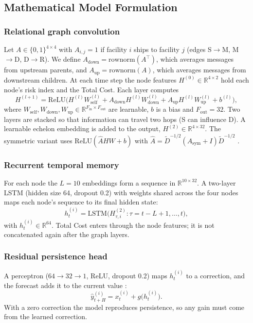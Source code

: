 \documentclass[conference]{IEEEtran}
\newcommand{\ReLU}{\mathrm{ReLU}}
\begin{document}
\subsection{Mathematical Model Formulation}\label{sec:math}
\subsubsection{Relational graph convolution}
Let $A\in\{0,1\}^{4\times4}$ with $A_{i,j}=1$ if facility $i$ ships to facility $j$ (edges S$\to$M, M$\to$D, D$\to$R). We define $A_{\mathrm{down}}=\mathrm{rownorm}(A^{\top})$, which averages messages from upstream parents, and $A_{\mathrm{up}}=\mathrm{rownorm}(A)$, which averages messages from downstream children. At each time step the node features $H^{(0)}\in\mathbb{R}^{4\times2}$ hold each node's risk index and the Total Cost. Each layer computes
\begin{equation}
H^{(l+1)}=\ReLU\!\big(H^{(l)}W^{(l)}_{\mathrm{self}}+A_{\mathrm{down}}H^{(l)}W^{(l)}_{\mathrm{down}}+A_{\mathrm{up}}H^{(l)}W^{(l)}_{\mathrm{up}}+b^{(l)}\big),
\end{equation}
where $W_{\mathrm{self}},W_{\mathrm{down}},W_{\mathrm{up}}\in\mathbb{R}^{F_{\mathrm{in}}\times F_{\mathrm{out}}}$ are learnable, $b$ is a bias and $F_{\mathrm{out}}=32$. Two layers are stacked so that information can travel two hops (S can influence D). A learnable echelon embedding is added to the output, $H^{(2)}\in\mathbb{R}^{4\times32}$. The symmetric variant uses $\ReLU(\hat{A}HW+b)$ with $\hat{A}=\tilde{D}^{-1/2}(A_{\mathrm{sym}}+I)\tilde{D}^{-1/2}$ \cite{r6}.

\subsubsection{Recurrent temporal memory}
For each node the $L=10$ embeddings form a sequence in $\mathbb{R}^{10\times32}$. A two-layer LSTM (hidden size 64, dropout 0.2) with weights shared across the four nodes maps each node's sequence to its final hidden state:
\begin{equation}
h^{(i)}_t=\mathrm{LSTM}\big(H^{(2)}_{\tau,i}:\tau=t-L+1,\dots,t\big),
\end{equation}
with $h^{(i)}_t\in\mathbb{R}^{64}$. Total Cost enters through the node features; it is not concatenated again after the graph layers.

\subsubsection{Residual persistence head}
A perceptron ($64\to32\to1$, ReLU, dropout 0.2) maps $h^{(i)}_t$ to a correction, and the forecast adds it to the current value \cite{r18}:
\begin{equation}
\hat{y}^{(i)}_{t+H}=x^{(i)}_t+g\big(h^{(i)}_t\big).
\end{equation}
With a zero correction the model reproduces persistence, so any gain must come from the learned correction.
\end{document}
